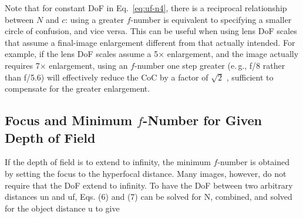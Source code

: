 \documentclass[11pt, oneside]{scrartcl}   	%
\begin{document}
Note that for constant DoF in Eq.~\ref{eq:uf-n4}, there is a reciprocal relationship between $N$ and
$c$: using a greater $f$-number is equivalent to specifying a smaller circle of confusion, and vice versa. This can be useful when using lens DoF scales that assume a final-image enlargement different from that actually intended. For example, if the lens DoF scales assume a 5× enlargement, and the image actually requires 7× enlargement, using an $f$-number one step greater (e.\,g., f/8 rather than f/5.6) will effectively reduce the CoC by a factor of $\sqrt 2$ , sufficient to compensate for the greater enlargement.
\subsection{Focus and Minimum $f$-Number for Given Depth of Field}

If the depth of field is to extend to infinity, the minimum $f$-number is obtained by setting the focus to the hyperfocal distance. Many images, however, do not require that the DoF extend to infinity. To have the DoF between two arbitrary distances un and uf, Eqs. (6) and (7) can be solved for N, combined, and solved for the object distance u to give


\end{document}
